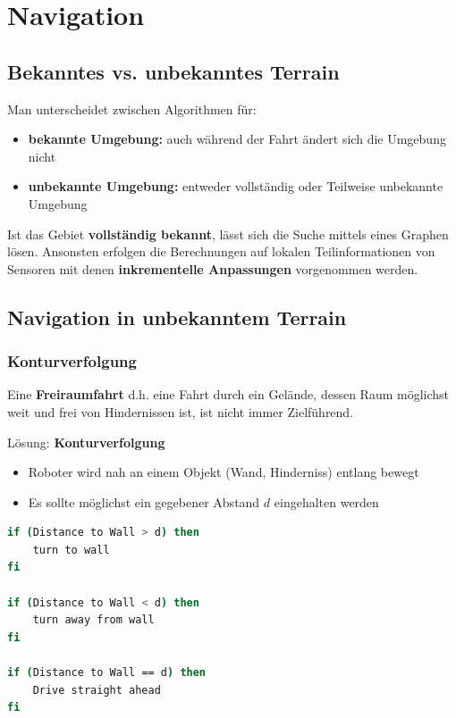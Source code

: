 \chapter{Navigation}
\section{Bekanntes vs. unbekanntes Terrain}
Man unterscheidet zwischen Algorithmen für:
\begin{itemize}
	\item \textbf{bekannte Umgebung:} auch während der Fahrt ändert sich die
		Umgebung nicht
	\item \textbf{unbekannte Umgebung:} entweder vollständig oder Teilweise
		unbekannte Umgebung
\end{itemize}

Ist das Gebiet \textbf{vollständig bekannt}, lässt sich die Suche mittels eines
Graphen lösen. Ansonsten erfolgen die Berechnungen auf lokalen
Teilinformationen von Sensoren mit denen \textbf{inkrementelle Anpassungen}
vorgenommen werden.

\section{Navigation in unbekanntem Terrain}
\subsection{Konturverfolgung}
Eine \textbf{Freiraumfahrt} d.h. eine Fahrt durch ein Gelände, dessen
Raum möglichst weit und frei von Hindernissen ist, ist nicht immer Zielführend.

Lösung: \textbf{Konturverfolgung}
\begin{itemize}
	\item Roboter wird nah an einem Objekt (Wand, Hinderniss) entlang bewegt
	\item Es sollte möglichst ein gegebener Abstand $d$ eingehalten werden
\end{itemize}

\begin{lstlisting}[language=bash, caption={Regelung des Abstands $d$}]
if (Distance to Wall > d) then
	turn to wall
fi

if (Distance to Wall < d) then
	turn away from wall
fi

if (Distance to Wall == d) then
	Drive straight ahead
fi
\end{lstlisting}

